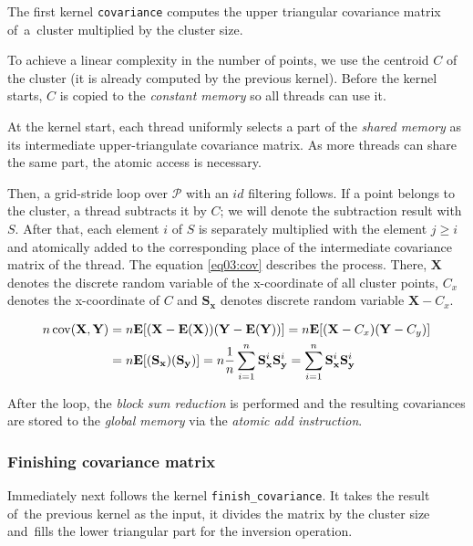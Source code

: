 The first kernel \texttt{covariance} computes the upper triangular covariance matrix of~a~cluster multiplied by the cluster size. 

To achieve a linear complexity in the number of points, we use the centroid $C$ of the cluster (it is already computed by the previous kernel). Before the kernel starts, $C$ is copied to the \emph{constant memory} so all threads can use it.

At the kernel start, each thread uniformly selects a part of the \emph{shared memory} as its intermediate upper-triangulate covariance matrix. As more threads can share the same part, the atomic access is necessary.

Then, a grid-stride loop over $\mathcal{P}$ with an $id$ filtering follows. If a point belongs to the cluster, a thread subtracts it by $C$; we will denote the subtraction result with $S$. After that, each element $i$ of $S$ is separately multiplied with the element $j \ge i$ and atomically added to the corresponding place of the intermediate covariance matrix of the thread. The equation \ref{eq03:cov} describes the process. There, $\textbf{X}$ denotes the discrete random variable of the x-coordinate of all cluster points, $C_x$ denotes the x-coordinate of $C$ and $\mathbf{S_x}$ denotes discrete random variable $\mathbf{X}-C_x$.

\begin{equation}
\begin{split}
n\operatorname{cov}(\mathbf{X},\mathbf{Y}) &= n\mathbf{E}[(\mathbf{X}-\mathbf{E}(\mathbf{X}))(\mathbf{Y}-\mathbf{E}(\mathbf{Y}))] = n\mathbf{E}[(\mathbf{X}-C_x)(\mathbf{Y}-C_y)] \\ &= n\mathbf{E}[(\mathbf{S_x})(\mathbf{S_y})] = n\frac{1}{n}\sum_{i=1}^{n}{\mathbf{S}_{\mathbf{x}}^{i}\mathbf{S}_{\mathbf{y}}^{i}} = \sum_{i=1}^{n}{\mathbf{S}_{\mathbf{x}}^{i}\mathbf{S}_{\mathbf{y}}^{i}}
\end{split}
\label{eq03:cov}
\end{equation}

After the loop, the \emph{block sum reduction} is performed and the resulting covariances are stored to the \emph{global memory} via the \emph{atomic add instruction}.

\subsubsection{Finishing covariance matrix}
Immediately next follows the kernel \texttt{finish\_covariance}. It takes the result of~the previous kernel as the input, it divides the matrix by the cluster size and~fills the lower triangular part for the inversion operation.

